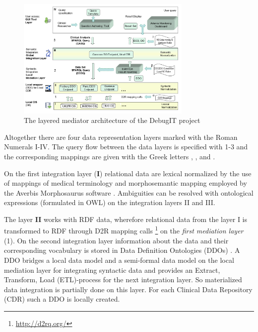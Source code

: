 \begin{figure}[]
	\begin{center}
		\includegraphics[width=0.75\textwidth]{figures/DebugIT-Ontology-mediated-layered-Data-Integration-architecture.png}
	\end{center}
	\caption{The layered mediator architecture of the DebugIT project}
	\label{DebugITArchitectureFigure}
\end{figure}

Altogether there are four data representation layers marked with the Roman Numerals I-IV. The query flow between the data layers is specified with 1-3 and the corresponding mappings are given with the Greek letters \textalpha , \textbeta,  and \textgamma .

On the first integration layer (\textbf{I}) relational data are lexical normalized by the use of mappings of medical terminology and morphosemantic mapping employed by the Averbis Morphosaurus software \cite{DaumkeDiss}. Ambiguities can be resolved with ontological expressions (formulated in OWL) on the integration layers II and III. 

The layer \textbf{II} works with RDF data, wherefore relational data from the layer I is transformed to RDF through D2R mapping calls \footnote{\url{http://d2rq.org/}} on the\emph{ first mediation layer} (1). On the second integration layer information about the data and their corresponding vocabulary is stored in Data Definition Ontologies (DDOs) \cite{DebugITDDO}. A DDO bridges a local data model and a semi-formal data model on the local mediation layer for integrating syntactic data and provides an Extract, Transform, Load (ETL)-process \cite[p. 382]{DBLP:books/dp/LeserN2006} for the next integration layer. So materialized data integration is partially done on this layer.
For each Clinical Data Repository (CDR) such a DDO is locally created. 

